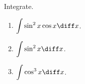 Integrate.
\begin{enumerate}
\item $\displaystyle \int \sin^2 x \cos x\diff x$.
\item $\displaystyle \int \sin^2 x\diff x$.
\item $\displaystyle \int \cos^3 x\diff x$.
\end{enumerate}
